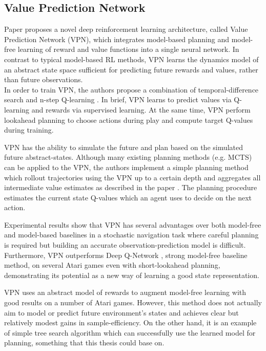 \subsection{Value Prediction Network}

Paper \cite{Algo.VPN} proposes a novel deep reinforcement learning architecture, called Value Prediction Network (VPN), which integrates model-based planning and model-free learning of reward and value functions into a single neural network. In contrast to typical model-based RL methods, VPN learns the dynamics model of an abstract state space sufficient for predicting future rewards and values, rather than future observations. \\
In order to train VPN, the authors propose a combination of temporal-difference search \cite{Algo.TDSearch} and n-step Q-learning \cite{Algo.A3C}. In brief, VPN learns to predict values via Q-learning and rewards via supervised learning. At the same time, VPN perform lookahead planning to choose actions during play and compute target Q-values during training.

VPN has the ability to simulate the future and plan based on the simulated future abstract-states. Although many existing planning methods (e.g. MCTS) can be applied to the VPN, the authors implement a simple planning method which rollout trajectories using the VPN up to a certain depth and aggregates all intermediate value estimates as described in the paper \cite{Algo.VPN}. The planning procedure estimates the current state Q-values which an agent uses to decide on the next action.

Experimental results show that VPN has several advantages over both model-free and model-based baselines in a stochastic navigation task where careful planning is required but building an accurate observation-prediction model is difficult. Furthermore, VPN outperforms Deep Q-Network \cite{Algo.DQN}, strong model-free baseline method, on several Atari games even with short-lookahead planning, demonstrating its potential as a new way of learning a good state representation.

VPN uses an abstract model of rewards to augment model-free learning with good results on a number of Atari games. However, this method does not actually aim to model or predict future environment's states and achieves clear but relatively modest gains in sample-efficiency. On the other hand, it is an example of simple tree search algorithm which can successfully use the learned model for planning, something that this thesis could base on.
